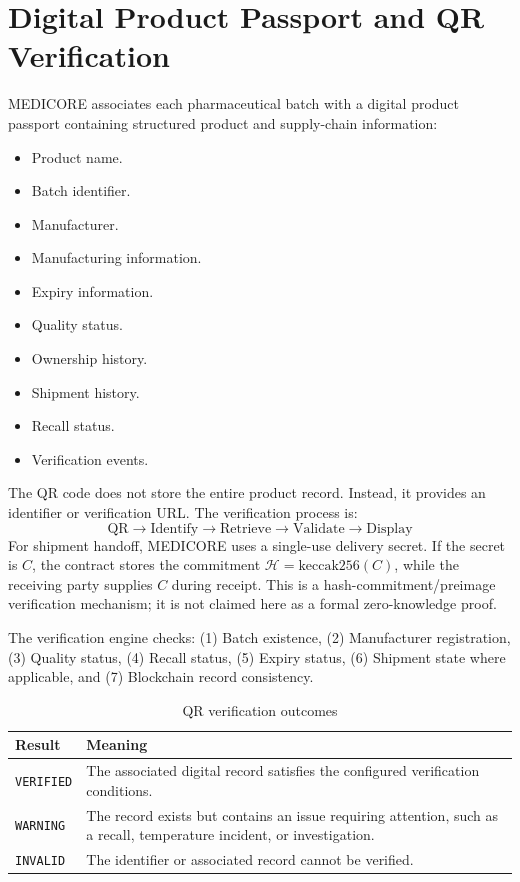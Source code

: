 \documentclass[11pt,a4paper]{article}
\begin{document}
\section{Digital Product Passport and QR Verification}
MEDICORE associates each pharmaceutical batch with a digital product passport containing structured product and supply-chain information:
\begin{itemize}
    \item Product name.
    \item Batch identifier.
    \item Manufacturer.
    \item Manufacturing information.
    \item Expiry information.
    \item Quality status.
    \item Ownership history.
    \item Shipment history.
    \item Recall status.
    \item Verification events.
\end{itemize}

The QR code does not store the entire product record. Instead, it provides an identifier or verification URL. The verification process is:
\begin{equation}
\text{QR} \to \text{Identify} \to \text{Retrieve} \to \text{Validate} \to \text{Display}
\end{equation}
For shipment handoff, MEDICORE uses a single-use delivery secret. If the secret is $C$, the contract stores the commitment $\mathcal{H} = \text{keccak256}(C)$, while the receiving party supplies $C$ during receipt. This is a hash-commitment/preimage verification mechanism; it is not claimed here as a formal zero-knowledge proof.

The verification engine checks: (1) Batch existence, (2) Manufacturer registration, (3) Quality status, (4) Recall status, (5) Expiry status, (6) Shipment state where applicable, and (7) Blockchain record consistency.

\begin{table}[htbp]
\centering
\caption{QR verification outcomes}
\label{tab:qr_outcomes}
\vspace{0.5em}
\begin{tabularx}{\textwidth}{lX}
\toprule
\textbf{Result} & \textbf{Meaning} \\
\midrule
\texttt{VERIFIED} & The associated digital record satisfies the configured verification conditions. \\
\texttt{WARNING} & The record exists but contains an issue requiring attention, such as a recall, temperature incident, or investigation. \\
\texttt{INVALID} & The identifier or associated record cannot be verified. \\
\bottomrule
\end{tabularx}
\end{table}
\end{document}

